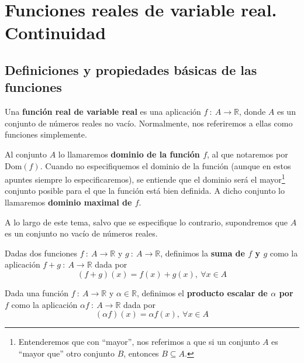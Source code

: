 \chapter{Funciones reales de variable real. Continuidad}\label{chp:Tema12}


\section{Definiciones y propiedades básicas de las funciones}
\begin{definicion}
    Una \textbf{función real de variable real} es una aplicación $f ~:~ A \longrightarrow \mathbb{R}$, donde $A$ es un conjunto de números reales no vacío. Normalmente, nos referiremos a ellas como funciones simplemente.

    Al conjunto $A$ lo llamaremos \textbf{dominio de la función $f$}, al que notaremos por $\text{Dom}(f)$. Cuando no especifiquemos el dominio de la función (aunque en estos apuntes siempre lo especificaremos), se entiende que el dominio será el mayor\footnote{Entenderemos que con ``mayor'', nos referimos a que si un conjunto $A$ es ``mayor que'' otro conjunto $B$, entonces $B \subseteq A$.} conjunto posible para el que la función está bien definida. A dicho conjunto lo llamaremos \textbf{dominio maximal de $f$}.
\end{definicion}

A lo largo de este tema, salvo que se especifique lo contrario, supondremos que $A$ es
un conjunto no vacío de números reales.

\begin{definicion}
    Dadas dos funciones $f ~:~ A \longrightarrow \mathbb{R}$ y $g ~:~ A \longrightarrow \mathbb{R}$,
    definimos la \textbf{suma de $f$ y $g$} como la aplicación $f+g ~:~ A \longrightarrow \mathbb{R}$ dada por
    \begin{equation*}
        (f+g)(x) = f(x) + g(x), ~ \forall x \in A
    \end{equation*}
\end{definicion}

\begin{definicion}
    Dada una función $f ~:~ A \longrightarrow \mathbb{R}$ y $\alpha \in \mathbb{R}$, definimos el \textbf{producto escalar de $\alpha$ por $f$}
    como la aplicación $\alpha f ~:~ A \longrightarrow \mathbb{R}$ dada por
    \begin{equation*}
        (\alpha f)(x) = \alpha f(x), ~ \forall x \in A
    \end{equation*}
\end{definicion}

